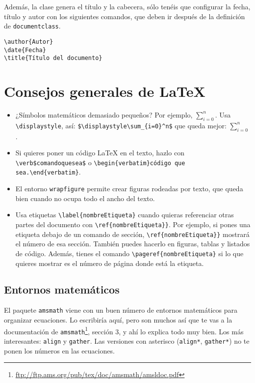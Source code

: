 \documentclass[nochap]{apuntes}
\begin{document}
 Además, la clase genera el título y la cabecera, sólo tenéis que configurar la fecha, título y autor con los siguientes comandos, que deben ir después de la definición de \texttt{documentclass}.

\begin{verbatim}
\author{Autor}
\date{Fecha}
\title{Título del documento}
\end{verbatim}

\section{Consejos generales de \LaTeX}

\begin{itemize}
\item ¿Símbolos matemáticos demasiado pequeños? Por ejemplo, $\sum_{i=0}^n$. Usa \verb|\displaystyle|, así: \verb|$\displaystyle\sum_{i=0}^n$| que queda mejor: $\displaystyle\sum_{i=0}^n$.
\item Si quieres poner un código LaTeX en el texto, hazlo con \verb|\verb$comandoquesea$| o \verb|\begin{verbatim}código que sea.\end{verbatim}|.
\item El entorno \texttt{wrapfigure} permite crear figuras rodeadas por texto, que queda bien cuando no ocupa  todo el ancho del texto.
\item Usa etiquetas \verb|\label{nombreEtiqueta}| cuando quieras referenciar otras partes del documento con \verb|\ref{nombreEtiqueta}}|. Por ejemplo, si pones una etiqueta debajo de un comando de sección, \verb|\ref{nombreEtiqueta}}| mostrará el número de esa sección. También puedes hacerlo en figuras, tablas y listados de código. Además, tienes el comando \verb|\pageref{nombreEtiqueta}| si lo que quieres mostrar es el número de página donde está la etiqueta.
\end{itemize}

\subsection{Entornos matemáticos}

El paquete \texttt{amsmath} viene con un buen número de entornos matemáticos para organizar ecuaciones. Lo escribiría aquí, pero son muchos así que te vas a la documentación de \texttt{amsmath}\footnote{\url{ftp://ftp.ams.org/pub/tex/doc/amsmath/amsldoc.pdf}}, sección 3, y ahí lo explica todo muy bien. Los más interesantes: \texttt{align} y \texttt{gather}. Las versiones con asterisco (\texttt{align*}, \texttt{gather*}) no te ponen los números en las ecuaciones.
\end{document}
